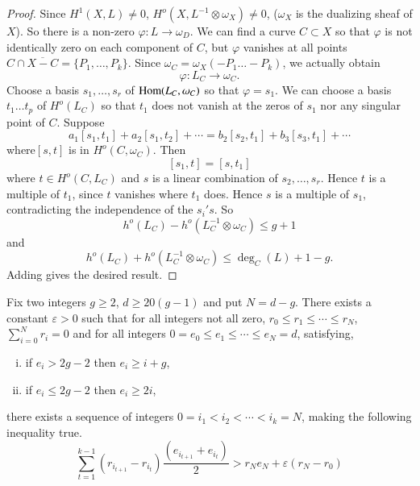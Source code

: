 {\begin{proof}
Since $ H^1 (X,L) \neq 0 $, $H^o ( X, L^{-1} \otimes \omega_X) \neq 0$,
($\omega_X$ is the dualizing sheaf  of $X$). So there is  a non-zero
$ \varphi : L \rightarrow \omega_D $. We can find a curve  $ C 
\subset X$ so that $\varphi$ is not identically zero  on each
component of $C$, but $\varphi$ vanishes at  all points    
$ C \cap \overline{X -C} = \{P_1, \ldots , P_k\}$. Since $\omega_C  =
\omega_X (-P_1 \ldots -P_k)$, we actually obtain  
$$
\varphi : L_C \rightarrow \omega_C.
$$
Choose a basis  $s_1,\ldots, s_r$ of  $\operatorname{Hom} (L_C,\omega_C)$ so that 
$\varphi = s_1$. We can choose a basis $t_1 \dots t_p$ of $H^o (L_C)$
so that  $t_1$  does not vanish at the zeros of $s_1$ nor any singular
point of $C$. Suppose 
$$
a_1 [s_1,t_1] + a_2 [s_1,t_2]  + \cdots = b_2 [s_2,t_1] + b_3
[s_3,t_1]  + \cdots  
$$
where\pageoriginale $[s,t]$ is in $ H^o (C, \omega_C)$. Then 
$$
[s_1,t] = [s,t_1]
$$
where  $t \in H^o (C, L_C)$ and  $s$ is a linear combination
of $s_2, \ldots, s_r$. Hence $t$ is a multiple of $t_1$, since $t$
vanishes  where  $t_1$ does. Hence $s$ is a multiple of $s_1$,
contradicting  the independence of the $s_i 's$. So  
$$
h^o (L_C)  - h^o (L^{-1}_{C} \otimes \omega_C) \leq  g+1  
$$
and 
$$
h^o (L_C)  + h^o  (L^{-1}_{C} \otimes \omega_C) \leq \deg_C (L) + 1-g. 
$$
Adding gives the desired result.
\end{proof}

\setcounter{sublemma}{3}
\begin{sublemma}\label{chap0:sublem0.2.4}%
Fix two integers  $g\ge 2$,  $d \ge 20 (g-1)$  and put  $N =
d-g$. There exists a constant $\varepsilon > 0$  such that for all
integers not all zero, $ r_0 \leq r_1 \leq \cdots \leq r_N$, 
$\sum\limits^{N}_{i=0} r_i = 0 $ and for all integers 
$0= e_0 \leq e_1\leq\cdots \leq e_N  = d$, satisfying, 
\begin{enumerate}[i)]
\item if $e_i > 2 g-2$ then  $e_i \ge i+g$,

\item if $ e_i \leq 2 g-2$ then  $e_i \ge 2 i$,
\end{enumerate}
there exists a sequence of integers  $0 = i_1 < i_2 < 
\cdots < i_k =N$, making the following inequality true. 
\begin{equation*}
\sum^{k-1}_{t=1} (r_{i_{t+1}} - r_{i_{t}})
\frac{(e_{i_{t+1}}+e_{i_{t}})}{2} > r_N e_N + \varepsilon (r_N -r_0)
\tag{1}\label{c0:eq1} 
\end{equation*}
\end{sublemma}


}
